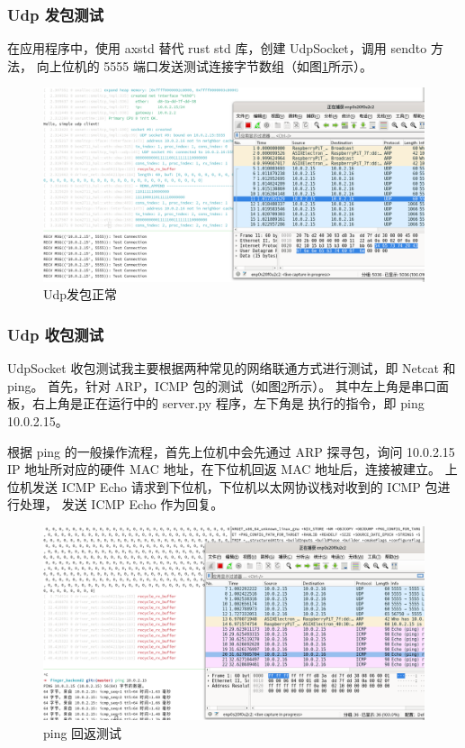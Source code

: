     \subsubsection{Udp 发包测试}

    在应用程序中，使用 axstd 替代 rust std 库，创建 UdpSocket，调用 sendto 方法，
    向上位机的 5555 端口发送测试连接字节数组（如图\ref{test::Udp发包}所示）。

    \begin{figure}[ht]
        \centering
        \includegraphics[width=\textwidth]{./imgs/测试-udp发包正常.png}
        \caption{Udp发包正常}    \label{test::Udp发包}
    \end{figure}   

    \subsubsection{Udp 收包测试}

    UdpSocket 收包测试我主要根据两种常见的网络联通方式进行测试，即 Netcat 和 ping。
    首先，针对 ARP，ICMP 包的测试（如图\ref{test::pingICMP回返测试}所示）。
    其中左上角是串口面板，右上角是正在运行中的 server.py 程序，左下角是
    执行的指令，即 ping 10.0.2.15。
    
    根据 ping 的一般操作流程，首先上位机中会先通过 ARP 探寻包，询问 10.0.2.15
    IP 地址所对应的硬件 MAC 地址，在下位机回返 MAC 地址后，连接被建立。
    上位机发送 ICMP Echo 请求到下位机，下位机以太网协议栈对收到的 ICMP 包进行处理，
    发送 ICMP Echo 作为回复。

    \begin{figure}[ht]
        \centering
        \includegraphics[width=\textwidth]{./imgs/测试-pingICMP回返测试.png}
        \caption{ping 回返测试}    \label{test::pingICMP回返测试}
    \end{figure}   

